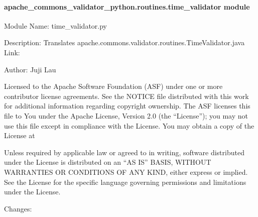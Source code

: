 \documentclass[letterpaper,10pt,english]{sphinxmanual}
\begin{document}
\paragraph{apache\_commons\_validator\_python.routines.time\_validator module}
\label{\detokenize{apache_commons_validator_python.routines:module-apache_commons_validator_python.routines.time_validator}}\label{\detokenize{apache_commons_validator_python.routines:apache-commons-validator-python-routines-time-validator-module}}
\sphinxAtStartPar
Module Name: time\_validator.py

\sphinxAtStartPar
Description: Translates apache.commons.validator.routines.TimeValidator.java
Link: 

\sphinxAtStartPar
Author: Juji Lau
\begin{description}
\sphinxAtStartPar
Licensed to the Apache Software Foundation (ASF) under one or more
contributor license agreements. See the NOTICE file distributed with
this work for additional information regarding copyright ownership.
The ASF licenses this file to You under the Apache License, Version 2.0
(the “License”); you may not use this file except in compliance with
the License. You may obtain a copy of the License at
\begin{quote}

\sphinxAtStartPar
{}
\end{quote}

\sphinxAtStartPar
Unless required by applicable law or agreed to in writing, software
distributed under the License is distributed on an “AS IS” BASIS,
WITHOUT WARRANTIES OR CONDITIONS OF ANY KIND, either express or implied.
See the License for the specific language governing permissions and
limitations under the License.

\end{description}

\sphinxAtStartPar
Changes:
\end{document}
